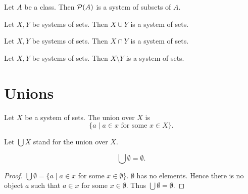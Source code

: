 \documentclass[10pt]{article}
\begin{document}
  \begin{forthel}
    \begin{proposition}
      Let $A$ be a class.
      Then $\mathcal{P}(A)$ is a system of subsets of $A$.
    \end{proposition}
  \end{forthel}

  \begin{forthel}
    \begin{proposition}
      Let $X, Y$ be systems of sets.
      Then $X \cup Y$ is a system of sets.
    \end{proposition}
  \end{forthel}

  \begin{forthel}
    \begin{proposition}
      Let $X, Y$ be systems of sets.
      Then $X \cap Y$ is a system of sets.
    \end{proposition}
  \end{forthel}

  \begin{forthel}
    \begin{proposition}
      Let $X, Y$ be systems of sets.
      Then $X \setminus Y$ is a system of sets.
    \end{proposition}
  \end{forthel}


  \section{Unions}

  \begin{forthel}
    \begin{definition}
      Let $X$ be a system of sets.
      The union over $X$ is
      \[ \{ a \mid \text{$a \in x$ for some $x \in X$} \}. \]
    \end{definition}

    Let $\bigcup X$ stand for the union over $X$.
  \end{forthel}

  \begin{forthel}
    \begin{proposition}
      \[ \bigcup \emptyset = \emptyset. \]
    \end{proposition}
    \begin{proof}
      $\bigcup \emptyset = \{ a \mid a \in x$ for some $x \in \emptyset \}$.
      $\emptyset$ has no elements.
      Hence there is no object $a$ such that $a \in x$ for some
      $x \in \emptyset$.
      Thus $\bigcup \emptyset = \emptyset$.
    \end{proof}
  \end{forthel}
\end{document}
